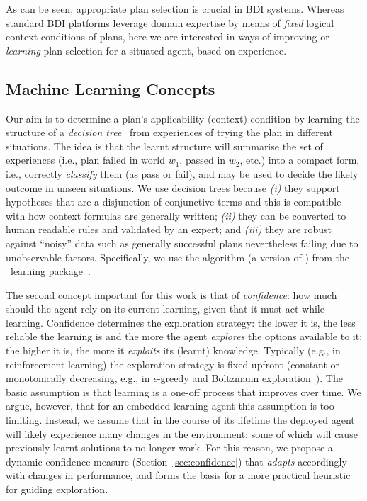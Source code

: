 As can be seen, appropriate plan selection is crucial in BDI systems. Whereas standard BDI platforms leverage domain expertise by means of \emph{fixed} logical context conditions of plans, here we are interested in ways of improving or \emph{learning} plan selection for a situated agent, based on experience.




\subsection{Machine Learning Concepts}

Our aim is to determine a plan's applicability (context) condition by learning the structure of a {\em decision tree}~\cite{Mitchell97:ML} from experiences of trying the plan in different situations. The idea is that the learnt structure will summarise the set of experiences (i.e., plan failed in world $w_1$, passed in $w_2$, etc.) into a compact form, i.e., correctly {\em classify} them (as pass or fail), and may be used to decide the likely outcome in unseen situations.
%
We use decision trees because \emph{(i)} they support hypotheses that are a disjunction of conjunctive terms and this is compatible with how context formulas are generally written; \emph{(ii)} they can be converted to human readable rules and validated by an expert; and \emph{(iii)} they are robust against ``noisy'' data such as generally successful plans nevertheless failing due to unobservable factors. 
%
Specifically, we use the algorithm  (a version of ) from the \weka\ learning package~\cite{weka99}.



The second concept important for this work is that of {\em confidence}: how much should the agent rely on its current learning, given that it must act while learning. Confidence determines the exploration strategy: the lower it is, the less reliable the learning is and the more the agent {\em explores} the options available to it; the higher it is, the more it {\em exploits} its (learnt) knowledge. Typically (e.g., in reinforcement learning) the exploration strategy is fixed upfront (constant or monotonically decreasing, e.g., in $\epsilon$-greedy and Boltzmann exploration~\cite{sutton98:reinforcement}). The basic assumption is that learning is a one-off process that improves over time. We argue, however, that for an embedded learning agent this assumption is too limiting. Instead, we assume that in the course of its lifetime the deployed agent will likely experience many changes in the environment: some of which will cause previously learnt solutions to no longer work. For this reason, we propose a dynamic confidence measure (Section~\ref{sec:confidence}) that {\em adapts} accordingly with changes in performance, and forms the basis for a more practical heuristic for guiding exploration.

